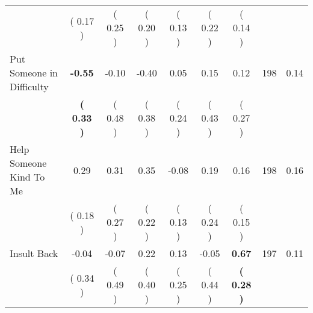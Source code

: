 \begin{tabular}{lcccccccc}
 & (     0.17 ) & (     0.25 ) & (     0.20 ) & (     0.13 ) & (     0.22 ) & (     0.14 ) & \\
Put Someone in Difficulty & \textbf{    -0.55} &     -0.10 &     -0.40 &      0.05 &      0.15 &      0.12 & 198 &       0.14 \\ 
 & \textbf{(     0.33 )} & (     0.48 ) & (     0.38 ) & (     0.24 ) & (     0.43 ) & (     0.27 ) & \\
Help Someone Kind To Me &      0.29 &      0.31 &      0.35 &     -0.08 &      0.19 &      0.16 & 198 &       0.16 \\ 
 & (     0.18 ) & (     0.27 ) & (     0.22 ) & (     0.13 ) & (     0.24 ) & (     0.15 ) & \\
Insult Back &     -0.04 &     -0.07 &      0.22 &      0.13 &     -0.05 & \textbf{     0.67} & 197 &       0.11 \\ 
 & (     0.34 ) & (     0.49 ) & (     0.40 ) & (     0.25 ) & (     0.44 ) & \textbf{(     0.28 )} & \\
\bottomrule
\end{tabular}
